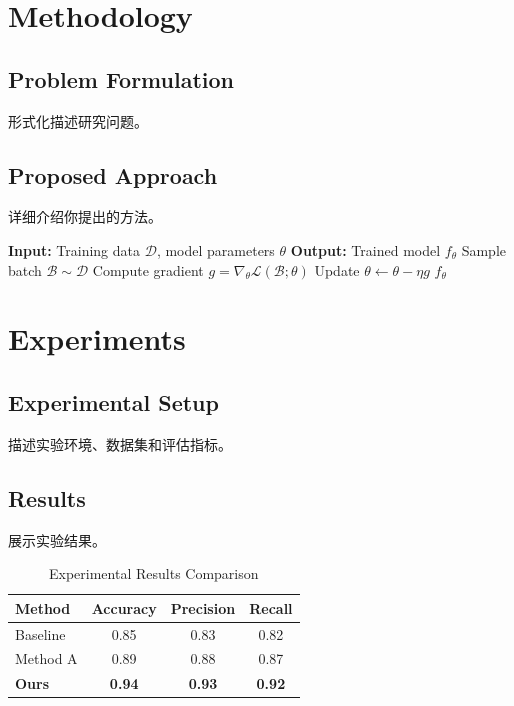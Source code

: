 \documentclass[12pt,a4paper]{article}
\begin{document}
\section{Methodology}
\label{sec:methodology}

\subsection{Problem Formulation}
形式化描述研究问题。

\subsection{Proposed Approach}
详细介绍你提出的方法。

\begin{algorithm}[t]
\caption{Your Algorithm Name}
\label{alg:main}
\begin{algorithmic}[1]
\State \textbf{Input:} Training data $\mathcal{D}$, model parameters $\theta$
\State \textbf{Output:} Trained model $f_\theta$
    \State Sample batch $\mathcal{B} \sim \mathcal{D}$
    \State Compute gradient $g = \nabla_\theta \mathcal{L}(\mathcal{B}; \theta)$
    \State Update $\theta \leftarrow \theta - \eta g$
\EndWhile
\State \Return $f_\theta$
\end{algorithmic}
\end{algorithm}

\section{Experiments}
\label{sec:experiments}

\subsection{Experimental Setup}
描述实验环境、数据集和评估指标。

\subsection{Results}
展示实验结果。

\begin{table}[t]
\centering
\caption{Experimental Results Comparison}
\label{tab:results}
\begin{tabular}{lccc}
\toprule
\textbf{Method} & \textbf{Accuracy} & \textbf{Precision} & \textbf{Recall} \\
\midrule
Baseline & 0.85 & 0.83 & 0.82 \\
Method A & 0.89 & 0.88 & 0.87 \\
\textbf{Ours} & \textbf{0.94} & \textbf{0.93} & \textbf{0.92} \\
\bottomrule
\end{tabular}
\end{table}
\end{document}
